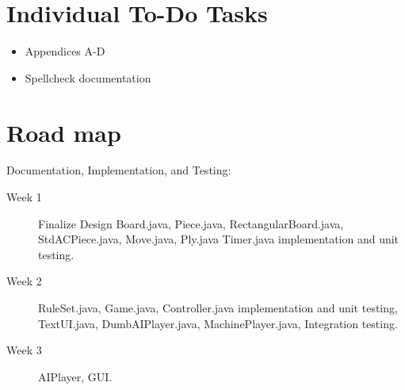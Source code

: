 

		\section{Individual To-Do Tasks}
			\begin{itemize}
				\item Appendices A-D
				\item Spellcheck documentation
			\end{itemize}


		\section{Road map}
			Documentation, Implementation, and Testing:
			\begin{description}
			 	\item[Week 1] Finalize Design
			 								Board.java, Piece.java, RectangularBoard.java, StdACPiece.java, 
			 								Move.java, Ply.java
			 							  Timer.java implementation and unit testing.
			 							   
			 		 						
				\item[Week 2] RuleSet.java, Game.java, Controller.java implementation and unit 
											testing, TextUI.java, DumbAIPlayer.java, MachinePlayer.java,
											Integration testing. 

				\item[Week 3] AIPlayer, GUI. 
			\end{description}